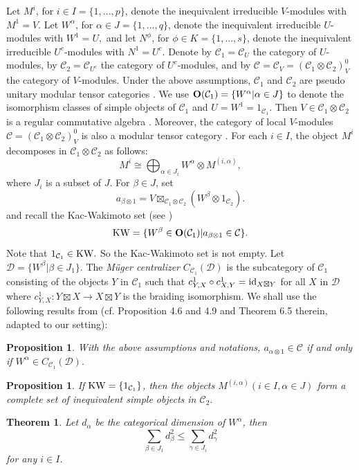 \documentclass{article}
\newtheorem{theorem}[lemma]{Theorem}
\newtheorem{proposition}[lemma]{Proposition}
\def\CC{{\mathcal{C}}}
\def \Or{{\bf O}}
\def \KW {{\rm KW}}
\def\DD{{\mathcal{D}}}
\def\id{{\rm id}}
\begin{document}
Let $M^i$, for $i \in I=\{1,...,p\}$, denote the inequivalent irreducible $V$-modules with $M^1=V$.
Let $W^{\alpha}$, for $\alpha\in J=\{1,...,q\}$, denote the inequivalent irreducible $U$-modules with $W^1=U,$ and let $N^{\phi}$, for $\phi\in K=\{1,...,s\}$, denote the inequivalent irreducible $U^c$-modules
with $N^1=U^c.$ Denote by $\CC_1=\CC_U$  the category of $U$-modules, by $\CC_2=\CC_{U^c}$ the category of $U^c$-modules, and by
$\CC=\CC_V=(\CC_1\otimes \CC_2)_V^0$ the category of $V$-modules.  Under the above assumptions, $\CC_1$ and $\CC_2$ are pseudo unitary modular tensor categories \cite{ENO}. We use $\Or(\CC_1)=\{W^\alpha|\alpha\in J\}$  to denote the isomorphism classes of simple objects of $\CC_1$ and $U=W^1=1_{\CC_1}.$  Then $V\in \CC_1\otimes \CC_2$ is a regular commutative algebra \cite{HKL}. Moreover, the category of local $V$-modules $\CC=(\CC_1\otimes \CC_2)_V^0$ is also a modular tensor category \cite{HKL}. For each $i\in I$, the object $M^i$ decomposes in $\CC_1\otimes \CC_2$ as follows:
\begin{equation}\label{maindecom}
	M^i\cong\bigoplus_{\alpha\in J_i}W^\alpha\otimes M^{(i,\alpha)},
\end{equation}
where $J_i$ is a subset of $J.$   For $\beta\in J$, set
$$a_{\beta\otimes 1}=V\boxtimes_{\CC_1\otimes \CC_2}(W^\beta\otimes 1_{\CC_2}).$$
and recall the Kac-Wakimoto set (see \cite{DRX2})
$$\KW=\{W^\beta\in \Or(\CC_1)|a_{\beta\otimes 1}\in\CC\}.$$
Note that $1_{\CC_1}\in \KW.$ So the Kac-Wakimoto set is not empty. Let ${\DD}=\{W^\beta|\beta\in J_1\}.$  The \emph{M\"uger centralizer} $C_{\CC_1}(\DD)$ is the  subcategory of $\CC_1$ consisting of the objects $Y$ in $\CC_1$ such that $c^1_{Y,X}\circ  c^1_{X,Y} = \id_{X\boxtimes Y}$  for all $X$ in $\DD$ where $c^1_{Y,X}:Y\boxtimes X\to X\boxtimes Y$ is the braiding isomorphism.
We shall use the following results from \cite{DRX2} (cf. Proposition 4.6 and 4.9 and Theorem 6.5 therein, adapted to our setting):
\begin{proposition}\label{muger} With the above assumptions and notations, $a_{\alpha\otimes 1}\in \CC$  if and only if $W^\alpha\in C_{\CC_1}(\DD).$
\end{proposition}

\begin{proposition}\label{kacW}  If $\KW=\{1_{\CC_1}\}$, then the objects $M^{(i,\alpha)} (i\in I, \alpha\in J)$ form a complete set of inequivalent simple objects in $\CC_2.$
\end{proposition}

\begin{theorem}\label{cvalue}
	Let $d_{\alpha}$ be the categorical dimension of $W^{\alpha}$, then
	\begin{equation*}
		\sum_{\beta\in J_1}d_{\beta}^2\leq 	\sum_{\gamma\in J_i}d_{\gamma}^2
	\end{equation*}
	for any $i\in I$.
\end{theorem}
\end{document}
